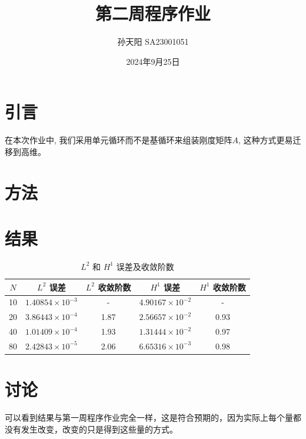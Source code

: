 \documentclass{article}
\title{第二周程序作业}
\author{孙天阳 SA23001051}
\date{2024年9月25日}
\begin{document}
\maketitle

\section{引言}
在本次作业中, 我们采用单元循环而不是基循环来组装刚度矩阵$ A $, 这种方式更易迁移到高维。
\section{方法}

\section{结果}
\begin{table}[h!]
    \centering
    \caption{\( L^2 \) 和 \( H^1 \) 误差及收敛阶数}
    \label{tab:results}
    \begin{tabular}{ccccc}
        \toprule
        \( N \) & \( L^2 \) 误差 & \( L^2 \) 收敛阶数 & \( H^1 \) 误差 & \( H^1 \) 收敛阶数 \\
        \midrule
        10  & \( 1.40854 \times 10^{-3} \) & -    & \( 4.90167 \times 10^{-2} \) & - \\
        20  & \( 3.86443 \times 10^{-4} \) & 1.87 & \( 2.56657 \times 10^{-2} \) & 0.93 \\
        40  & \( 1.01409 \times 10^{-4} \) & 1.93 & \( 1.31444 \times 10^{-2} \) & 0.97 \\
        80  & \( 2.42843 \times 10^{-5} \) & 2.06 & \( 6.65316 \times 10^{-3} \) & 0.98 \\
        \bottomrule
    \end{tabular}
\end{table}
\section{讨论}
可以看到结果与第一周程序作业完全一样，这是符合预期的，因为实际上每个量都没有发生改变，改变的只是得到这些量的方式。
\end{document}
